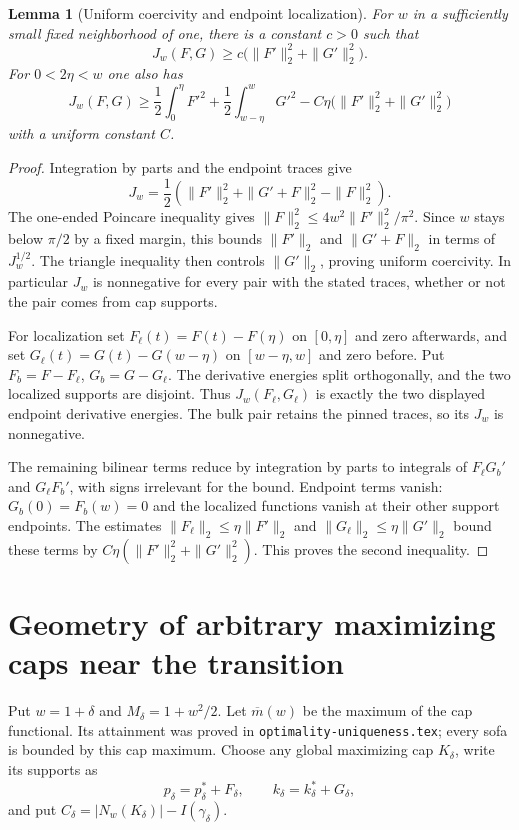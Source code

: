 \documentclass[11pt]{article}
\newtheorem{lemma}[theorem]{Lemma}
\begin{document}
\begin{lemma}[Uniform coercivity and endpoint localization]\label{lem:local}
For $w$ in a sufficiently small fixed neighborhood of one, there is a constant $c>0$ such that
\[
 J_w(F,G)\ge c\bigl(\|F'\|_2^2+\|G'\|_2^2\bigr).
\]
For $0<2\eta<w$ one also has
\[
 J_w(F,G)\ge\frac12\int_0^\eta F'^2+\frac12\int_{w-\eta}^wG'^2
 -C\eta\bigl(\|F'\|_2^2+\|G'\|_2^2\bigr)
\]
with a uniform constant $C$.
\end{lemma}
\begin{proof}
Integration by parts and the endpoint traces give
\[
 J_w=\frac12\left(\|F'\|_2^2+\|G'+F\|_2^2-\|F\|_2^2\right).
\]
The one-ended Poincare inequality gives $\|F\|_2^2\le4w^2\|F'\|_2^2/\pi^2$. Since $w$ stays below $\pi/2$ by a fixed margin, this bounds $\|F'\|_2$ and $\|G'+F\|_2$ in terms of $J_w^{1/2}$. The triangle inequality then controls $\|G'\|_2$, proving uniform coercivity. In particular $J_w$ is nonnegative for every pair with the stated traces, whether or not the pair comes from cap supports.

For localization set $F_\ell(t)=F(t)-F(\eta)$ on $[0,\eta]$ and zero afterwards, and set $G_\ell(t)=G(t)-G(w-\eta)$ on $[w-\eta,w]$ and zero before. Put $F_b=F-F_\ell$, $G_b=G-G_\ell$. The derivative energies split orthogonally, and the two localized supports are disjoint. Thus $J_w(F_\ell,G_\ell)$ is exactly the two displayed endpoint derivative energies. The bulk pair retains the pinned traces, so its $J_w$ is nonnegative.

The remaining bilinear terms reduce by integration by parts to integrals of $F_\ell G_b'$ and $G_\ell F_b'$, with signs irrelevant for the bound. Endpoint terms vanish: $G_b(0)=F_b(w)=0$ and the localized functions vanish at their other support endpoints. The estimates $\|F_\ell\|_2\le\eta\|F'\|_2$ and $\|G_\ell\|_2\le\eta\|G'\|_2$ bound these terms by $C\eta(\|F'\|_2^2+\|G'\|_2^2)$. This proves the second inequality.
\end{proof}

\section{Geometry of arbitrary maximizing caps near the transition}
Put $w=1+\delta$ and $M_\delta=1+w^2/2$. Let $\overline m(w)$ be the maximum of the cap functional. Its attainment was proved in \texttt{optimality-uniqueness.tex}; every sofa is bounded by this cap maximum. Choose any global maximizing cap $K_\delta$, write its supports as
\[
 p_\delta=p_\delta^*+F_\delta,\qquad k_\delta=k_\delta^*+G_\delta,
\]
and put $C_\delta=|N_w(K_\delta)|-I(\gamma_\delta)$.
\end{document}
